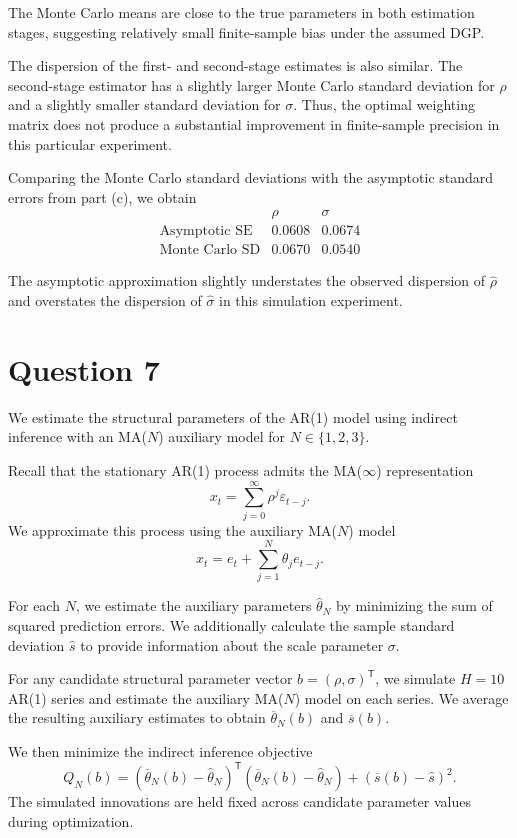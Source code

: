 \documentclass{article}
\begin{document}
The Monte Carlo means are close to the true parameters in
both estimation stages, suggesting relatively small
finite-sample bias under the assumed DGP.

The dispersion of the first- and second-stage estimates is
also similar. The second-stage estimator has a slightly
larger Monte Carlo standard deviation for $\rho$ and a
slightly smaller standard deviation for $\sigma$.
Thus, the optimal weighting matrix does not produce a
substantial improvement in finite-sample precision in
this particular experiment.

Comparing the Monte Carlo standard deviations with the
asymptotic standard errors from part (c), we obtain
\[
\begin{array}{lcc}
    & \rho & \sigma\\
    \hline
    \text{Asymptotic SE}
    & 0.0608 & 0.0674\\
    \text{Monte Carlo SD}
    & 0.0670 & 0.0540
\end{array}
\]

The asymptotic approximation slightly understates the
observed dispersion of $\widehat\rho$ and overstates the
dispersion of $\widehat\sigma$ in this simulation experiment.


\section*{Question 7}

We estimate the structural parameters of the AR(1) model using
indirect inference with an MA($N$) auxiliary model for
$N\in\{1,2,3\}$.

Recall that the stationary AR(1) process admits the
MA($\infty$) representation
\[
    x_t
    =
    \sum_{j=0}^{\infty}\rho^j\varepsilon_{t-j}.
\]
We approximate this process using the auxiliary MA($N$) model
\[
    x_t
    =
    e_t+\sum_{j=1}^{N}\theta_j e_{t-j}.
\]

For each $N$, we estimate the auxiliary parameters
$\widehat\theta_N$ by minimizing the sum of squared
prediction errors. We additionally calculate the sample
standard deviation $\widehat s$ to provide information
about the scale parameter $\sigma$.

For any candidate structural parameter vector
$b=(\rho,\sigma)^{\mathsf T}$, we simulate $H=10$
AR(1) series and estimate the auxiliary MA($N$) model
on each series. We average the resulting auxiliary
estimates to obtain $\overline\theta_N(b)$ and
$\overline s(b)$.

We then minimize the indirect inference objective
\[
    Q_N(b)
    =
    \left(
        \overline\theta_N(b)-\widehat\theta_N
    \right)^{\mathsf T}
    \left(
        \overline\theta_N(b)-\widehat\theta_N
    \right)
    +
    \left(
        \overline s(b)-\widehat s
    \right)^2.
\]
The simulated innovations are held fixed across candidate
parameter values during optimization.
\end{document}
